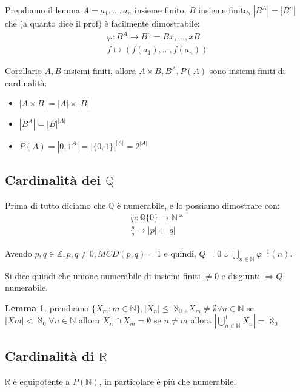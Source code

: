 \documentclass{article}
\theoremstyle{definition}
\newtheorem{lemma}{Lemma}[section]
\begin{document}
Prendiamo il lemma $A = {a_1,\ldots,a_n}$ insieme finito, $B$ insieme finito, $|B^A| = |B^n|$ che (a quanto dice il prof) è facilmente dimostrabile:
\begin{align*}
         \varphi : B^A \to B^n = Bx,\ldots,xB \\
                   f \mapsto (f(a_1),\ldots,f(a_n))
\end{align*}

Corollario $A,B$ insiemi finiti, allora $A \times B, B^A, P(A)$ sono insiemi finiti di cardinalità:
\begin{itemize}
        \item $|A \times B| = |A| \times |B|$	
        \item $|B^A| = |B|^{|A|}$
        \item $P(A) = |{0,1}^A| = |\{0,1\}|^{|A|} = 2^{|A|}$	
\end{itemize}



\subsection{Cardinalità dei $\mathbb{Q}$}
Prima di tutto diciamo che $\mathbb{Q}$ è numerabile, e lo possiamo dimostrare con:
\begin{align*}
        \varphi : \mathbb{Q}\{0\} \to \mathbb{N}* \\
        \frac{p}{q} \mapsto |p| + |q|
\end{align*}

Avendo $p,q \in \mathbb{Z}, p,q \not = 0, MCD(p,q)=1$ e quindi, $Q = {0} \cup \bigcup_{n \in \mathbb{N}}{\varphi^{-1}(n)}$.

Si dice quindi che \underline{unione numerabile} di insiemi finiti $\not = 0$ e disgiunti $\Rightarrow Q $ numerabile. \newline
{}

\begin{lemma}
        prendiamo $\{X_m : m \in \mathbb{N}\}, |X_n| \le \aleph_0, X_m \not = \emptyset \forall n \in \mathbb{N}$ se $|Xm| < \aleph_0 \forall n \in \mathbb{N}$ allora $X_n \cap X_m = \emptyset$ se $n \not = m$ allora $|\bigcup_{n \in \mathbb{N}}^{1}X_n| = \aleph_0$ \newline
\end{lemma}

\subsection{Cardinalità di $\mathbb{R}$}
$ \mathbb{R}$ è equipotente a $P(\mathbb{N})$, in particolare è più che numerabile. \par
\end{document}
